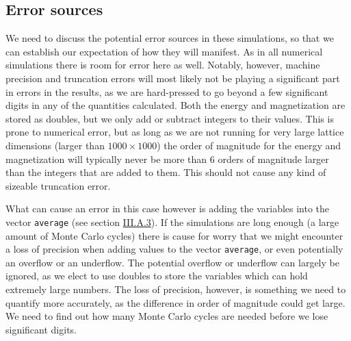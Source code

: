 \documentclass[reprint,english,notitlepage]{revtex4-1}  %
\begin{document}
\subsection{Error sources} \label{sec:III:C}

We need to discuss the potential error sources in these simulations, so that we can establish our expectation of how they will manifest. As in all numerical simulations there is room for error here as well. Notably, however, machine precision and truncation errors will most likely not be playing a significant part in errors in the results, as we are hard-pressed to go beyond a few significant digits in any of the quantities calculated. Both the energy and magnetization are stored as doubles, but we only add or subtract integers to their values. This is prone to numerical error, but as long as we are not running for very large lattice dimensions (larger than $1000\times 1000$) the order of magnitude for the energy and magnetization will typically never be more than 6 orders of magnitude larger than the integers that are added to them. This should not cause any kind of sizeable truncation error. 

What can cause an error in this case however is adding the variables into the vector \verb+average+ (see section \hyperref[sec:III:A:iii]{III.A.3}). If the simulations are long enough (a large amount of Monte Carlo cycles) there is cause for worry that we might encounter a loss of precision when adding values to the vector \verb+average+, or even potentially an overflow or an underflow. The potential overflow or underflow can largely be ignored, as we elect to use doubles to store the variables which can hold extremely large numbers. The loss of precision, however, is something we need to quantify more accurately, as the difference in order of magnitude could get large. We need to find out how many Monte Carlo cycles are needed before we lose significant digits. 
\end{document}
